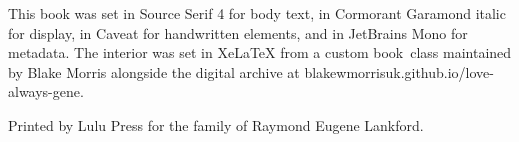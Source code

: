 
\cleardoublepage
\thispagestyle{laempty}
\vspace*{0.34\textheight}
\begin{center}
    \begin{minipage}{0.72\textwidth}
        \centering\itshape\small\color{walnutsoft}

        This book was set in Source Serif 4 for body text, in Cormorant
        Garamond italic for display, in Caveat for handwritten elements,
        and in JetBrains Mono for metadata. The interior was set in
        \mbox{XeLaTeX} from a custom \mbox{book class} maintained by Blake Morris
        alongside the digital archive at
        \mbox{blakewmorrisuk.github.io/love-always-gene}.

        \vspace{1.2em}
        \brassornament
        \vspace{0.8em}

        Printed by Lulu Press for the family of Raymond Eugene Lankford.

        \vspace{0.6em}
        \the\year
    \end{minipage}
\end{center}
\vfill
